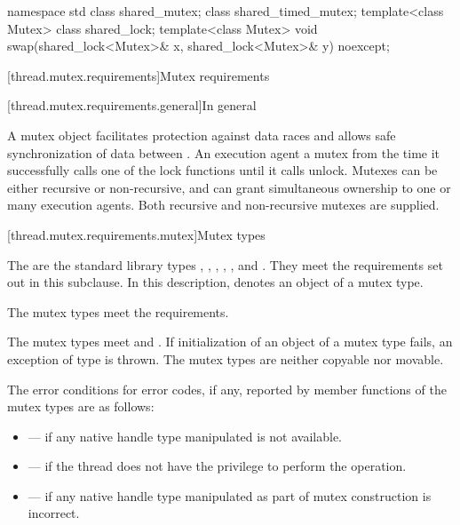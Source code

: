 %
\begin{codeblock}
namespace std {
  class shared_mutex;
  class shared_timed_mutex;
  template<class Mutex> class shared_lock;
  template<class Mutex>
    void swap(shared_lock<Mutex>& x, shared_lock<Mutex>& y) noexcept;
}
\end{codeblock}

[thread.mutex.requirements]{Mutex requirements}

[thread.mutex.requirements.general]{In general}

\pnum
A mutex object facilitates protection against data races and allows safe synchronization of
data between .
An execution agent  a mutex from the time it successfully calls one of the
lock functions until it calls unlock. Mutexes can be either recursive or non-recursive, and can
grant simultaneous ownership to one or many execution agents. Both
recursive and non-recursive mutexes are supplied.

[thread.mutex.requirements.mutex]{Mutex types}

\pnum
The  are the standard library types ,
, , ,
, and .
They meet the requirements set out in this subclause. In this description, 
denotes an object of a mutex type.

\pnum
The mutex types meet the  requirements.

\pnum
The mutex types meet  and .
If initialization of an object of a mutex type fails,
an exception of type  is thrown.
The mutex types are neither copyable nor movable.

\pnum
The error conditions for error codes, if any, reported by member functions of the mutex types
are as follows:
\begin{itemize}
\item {} --- if any native handle type manipulated is not available.
\item {} --- if the thread does not have the
privilege to perform the operation.
\item {} --- if any native handle type manipulated as part of mutex
construction is incorrect.
\end{itemize}


